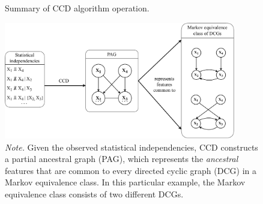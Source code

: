 \documentclass[twoside, 11pt]{article}
\begin{document}


\vspace{5mm}
\begin{figure}[H]
    \centering
        \caption{Summary of CCD algorithm operation.}
        \includegraphics[width=0.9\textwidth]{figures/Fig4.pdf}
        \vspace{3mm}
        \caption*{\small{\textit{Note.} Given the observed statistical independencies, CCD constructs a partial ancestral graph (PAG), which represents the \textit{ancestral} features that are common to every directed cyclic graph (DCG) in a Markov equivalence class. In this particular example, the Markov equivalence class consists of two different DCGs.}}
    \label{fig:4}
\end{figure}

\newpage
\end{document}
